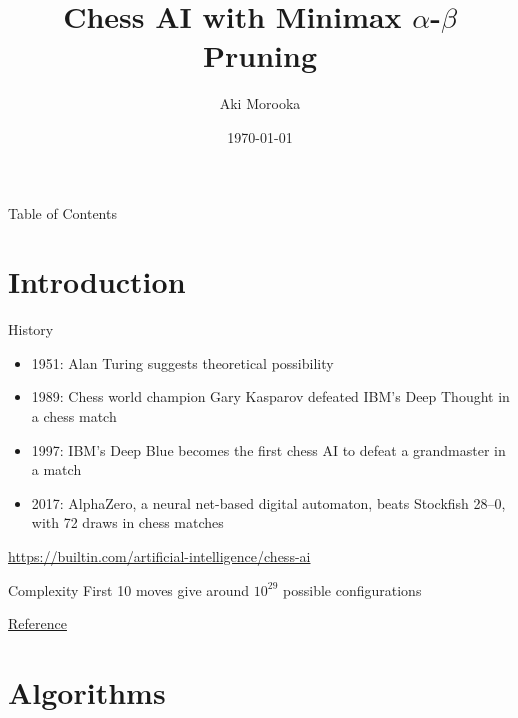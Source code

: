 \documentclass{beamer}
\title[Chess AI]{Chess AI with Minimax $\alpha$-$\beta$ Pruning}
\author{Aki Morooka}
\institute[Metropolia UAS]{Metropolia University of Applied Sciences}
\date{\today}
\begin{document}
\begin{frame}
  \titlepage
\end{frame}

\begin{frame}{Table of Contents}
  \tableofcontents
\end{frame}


\section{Introduction}


\begin{frame}{History}
  \begin{itemize}
    \item 1951: Alan Turing suggests theoretical possibility
    \item 1989: Chess world champion Gary Kasparov defeated IBM’s Deep Thought in a chess match
    \item 1997: IBM’s Deep Blue becomes the first chess AI to defeat a grandmaster in a match

    \item 2017: AlphaZero, a neural net-based digital automaton, beats Stockfish 28–0, with 72 draws in chess matches
  \end{itemize}

\vspace{1cm}
\href{https://builtin.com/artificial-intelligence/chess-ai}{https://builtin.com/artificial-intelligence/chess-ai}
\end{frame}

\begin{frame}{Complexity}
\center
    First 10 moves give around  $10^{29}$ possible configurations

    \vspace{1cm}

\href{https://www.reddit.com/r/chess/comments/o1bwhw/a_model_for_the_number_of_possible_moves_in_chess/}{Reference}
\end{frame}

\section{Algorithms}
\end{document}
